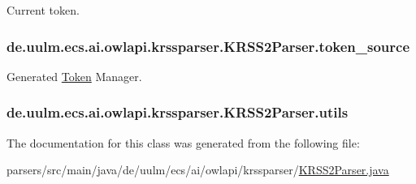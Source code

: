 Current token. \hypertarget{classde_1_1uulm_1_1ecs_1_1ai_1_1owlapi_1_1krssparser_1_1_k_r_s_s2_parser_a6a4c8007d3c885431ad88c31170d2d13}{
\subsubsection[{token\-\_\-source}]{ de.\-uulm.\-ecs.\-ai.\-owlapi.\-krssparser.\-K\-R\-S\-S2\-Parser.\-token\-\_\-source}}\label{classde_1_1uulm_1_1ecs_1_1ai_1_1owlapi_1_1krssparser_1_1_k_r_s_s2_parser_a6a4c8007d3c885431ad88c31170d2d13}
Generated \hyperlink{classde_1_1uulm_1_1ecs_1_1ai_1_1owlapi_1_1krssparser_1_1_token}{Token} Manager. \hypertarget{classde_1_1uulm_1_1ecs_1_1ai_1_1owlapi_1_1krssparser_1_1_k_r_s_s2_parser_a700dfc5ddb52d751504e504f1433f00c}{
\subsubsection[{utils}]{ de.\-uulm.\-ecs.\-ai.\-owlapi.\-krssparser.\-K\-R\-S\-S2\-Parser.\-utils\hspace{0.3cm}{\ttfamily [private]}}}\label{classde_1_1uulm_1_1ecs_1_1ai_1_1owlapi_1_1krssparser_1_1_k_r_s_s2_parser_a700dfc5ddb52d751504e504f1433f00c}


The documentation for this class was generated from the following file\-:\begin{DoxyCompactItemize}
\item 
parsers/src/main/java/de/uulm/ecs/ai/owlapi/krssparser/\hyperlink{_k_r_s_s2_parser_8java}{K\-R\-S\-S2\-Parser.\-java}\end{DoxyCompactItemize}
